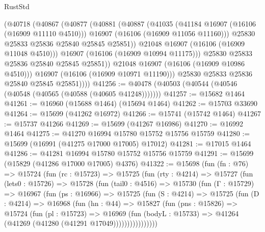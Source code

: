 \begin{lexlean}{RustStd}
\begin{coremodule}
                  (@40718
                    (@40867
                      (@40877
                        (@40881
                          (@40887
                            (@41035
                              (@41184 @16907 (@16106 (@16909 @11110 @4510)))
                              @16907
                              (@16106 (@16909 @11056 @11160)))
                            @25830
                            @25833
                            @25836
                            @25840
                            @25845
                            @25851))
                        @21048
                        @16907
                        (@16106 (@16909 @11048 @4510)))
                      @16907
                      (@16106 (@16909 @10994 @11175)))
                    @25830
                    @25833
                    @25836
                    @25840
                    @25845
                    @25851))
                @21048
                @16907
                (@16106 (@16909 @10986 @4510)))
              @16907
              (@16106 (@16909 @10971 @11190)))
            @25830
            @25833
            @25836
            @25840
            @25845
            @25851))))
@41256 := @40478 (@40503 (@40544 (@40546 (@40548 (@40565 (@40588 (@40605 @41248)))))))
@41257 := @15682 @1464
@41261 := @16960 (@15688 @1464) (@15694 @1464)
@41262 := @15703 @33690
@41264 := @15699 (@41262 @16972)
@41266 := @15741 (@15742 @1464)
@41267 := @15737 @41266
@41269 := @15699 (@41267 @16986)
@41270 := @16992 @1464
@41275 := @41270 @16994 @15780 @15752 @15756 @15759
@41280 := @15699 (@16991 (@41275 @17000 @17005) @17012)
@41281 := @17015 @1464
@41286 := @41281 @16994 @15780 @15752 @15756 @15759
@41291 := @15699 (@15829 (@41286 @17000 @17005) @4376)
@41322 := @15698
    (fun (fn : @76) =>
    @15724
      (fun (rc : @15723) =>
      @15725
        (fun (rty : @4214) =>
        @15727
          (fun (lets0 : @15726) =>
          @15728
            (fun (tail0 : @4516) =>
            @15730
              (fun (Γ : @15729) =>
              @16967
                (fun (ps : @16966) =>
                @15725
                  (fun (S : @4214) =>
                  @15725
                    (fun (D : @4214) =>
                    @16968
                      (fun (hn : @44) =>
                      @15827
                        (fun (pns : @15826) =>
                        @15724
                          (fun (pl : @15723) =>
                          @16969
                            (fun (bodyL : @15733) =>
                            @41264 (@41269 (@41280 (@41291 @17049))))))))))))))))

\end{coremodule}
\end{lexlean}
